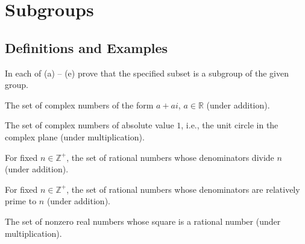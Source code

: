 \section{Subgroups}

\subsection{Definitions and Examples}

\begin{exercise}\label{ex2.1.1}
    In each of (a) -- (e) prove that the specified subset is a subgroup of the given group.
    \begin{subproblems}
        \item The set of complex numbers of the form $a + ai$, $a \in \mathbb{R}$ (under addition).
        \item The set of complex numbers of absolute value $1$, i.e., the unit circle in the complex plane (under multiplication).
        \item For fixed $n \in \mathbb{Z}^+$, the set of rational numbers whose denominators divide $n$ (under addition).
        \item For fixed $n \in \mathbb{Z}^+$, the set of rational numbers whose denominators are relatively prime to $n$ (under addition).
        \item The set of nonzero real numbers whose square is a rational number (under multiplication).
    \end{subproblems}
\end{exercise}

